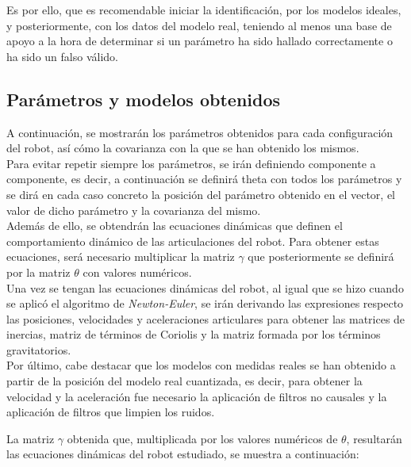 Es por ello, que es recomendable iniciar la identificación, por los modelos ideales, y posteriormente, con los datos del modelo real, teniendo al menos una base de apoyo a la hora de determinar si un parámetro ha sido hallado correctamente o ha sido un falso válido.



\subsection{Parámetros y modelos obtenidos}

A continuación, se mostrarán los parámetros obtenidos para cada configuración del robot, así cómo la covarianza con la que se han obtenido los mismos.\\

Para evitar repetir siempre los parámetros, se irán definiendo componente a componente, es decir, a continuación se definirá theta con todos los parámetros y se dirá en cada caso concreto la posición del parámetro obtenido en el vector, el valor de dicho parámetro y la covarianza del mismo. \\



Además de ello, se obtendrán las ecuaciones dinámicas que definen el comportamiento dinámico de las articulaciones del robot. Para obtener estas ecuaciones, será necesario multiplicar la matriz $\gamma$ que posteriormente se definirá por la matriz $\theta$ con valores numéricos. \\

Una vez se tengan las ecuaciones dinámicas del robot, al igual que se hizo cuando se aplicó el algoritmo de \textit{Newton-Euler}, se irán derivando las expresiones respecto las posiciones, velocidades y aceleraciones articulares para obtener las matrices de inercias, matriz de términos de Coriolis y la matriz formada por los términos gravitatorios.\\



Por último, cabe destacar que los modelos con medidas reales se han obtenido a partir de la posición del modelo real cuantizada, es decir, para obtener la velocidad y la aceleración fue necesario la aplicación de filtros no causales y la aplicación de filtros que limpien los ruidos.





La matriz $\gamma$ obtenida que, multiplicada por los valores numéricos de $\theta$, resultarán las ecuaciones dinámicas del robot estudiado, se muestra a continuación:



